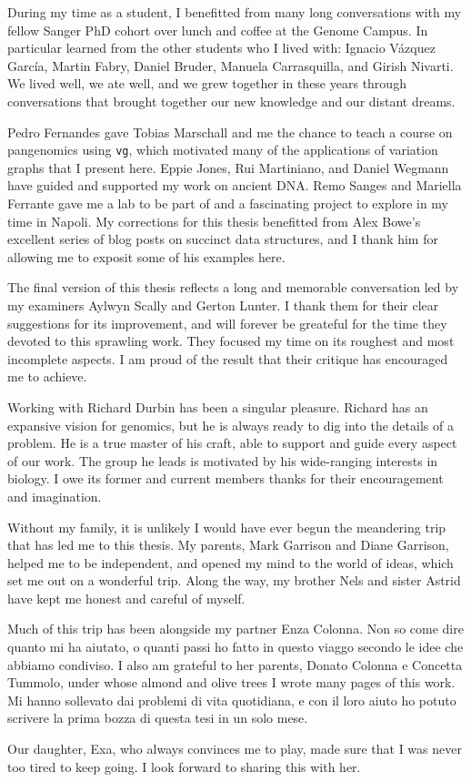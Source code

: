\begin{acknowledgements}
  During my time as a student, I benefitted from many long conversations with my fellow Sanger PhD cohort over lunch and coffee at the Genome Campus.
  In particular learned from the other students who I lived with: Ignacio V\'{a}zquez Garc\'{i}a, Martin Fabry, Daniel Bruder, Manuela Carrasquilla, and Girish Nivarti.
  We lived well, we ate well, and we grew together in these years through conversations that brought together our new knowledge and our distant dreams.

  Pedro Fernandes gave Tobias Marschall and me the chance to teach a course on pangenomics using {\tt vg}, which motivated many of the applications of variation graphs that I present here.
  Eppie Jones, Rui Martiniano, and Daniel Wegmann have guided and supported my work on ancient DNA.
  Remo Sanges and Mariella Ferrante gave me a lab to be part of and a fascinating project to explore in my time in Napoli.
  My corrections for this thesis benefitted from Alex Bowe's excellent series of blog posts on succinct data structures, and I thank him for allowing me to exposit some of his examples here.

  The final version of this thesis reflects a long and memorable conversation led by my examiners Aylwyn Scally and Gerton Lunter.
  I thank them for their clear suggestions for its improvement, and will forever be greateful for the time they devoted to this sprawling work.
  They focused my time on its roughest and most incomplete aspects.
  I am proud of the result that their critique has encouraged me to achieve.
  
  Working with Richard Durbin has been a singular pleasure.
  Richard has an expansive vision for genomics, but he is always ready to dig into the details of a problem.
  He is a true master of his craft, able to support and guide every aspect of our work.
  The group he leads is motivated by his wide-ranging interests in biology.
  I owe its former and current members thanks for their encouragement and imagination.

  Without my family, it is unlikely I would have ever begun the meandering trip that has led me to this thesis.
  My parents, Mark Garrison and Diane Garrison, helped me to be independent, and opened my mind to the world of ideas, which set me out on a wonderful trip.
  Along the way, my brother Nels and sister Astrid have kept me honest and careful of myself.

  Much of this trip has been alongside my partner Enza Colonna.
  Non so come dire quanto mi ha aiutato, o quanti passi ho fatto in questo viaggo secondo le idee che abbiamo condiviso.
  I also am grateful to her parents, Donato Colonna e Concetta Tummolo, under whose almond and olive trees I wrote many pages of this work.
  Mi hanno sollevato dai problemi di vita quotidiana, e con il loro aiuto ho potuto scrivere la prima bozza di questa tesi in un solo mese.
  
  Our daughter, Exa, who always convinces me to play, made sure that I was never too tired to keep going.
  I look forward to sharing this with her.

\end{acknowledgements}

